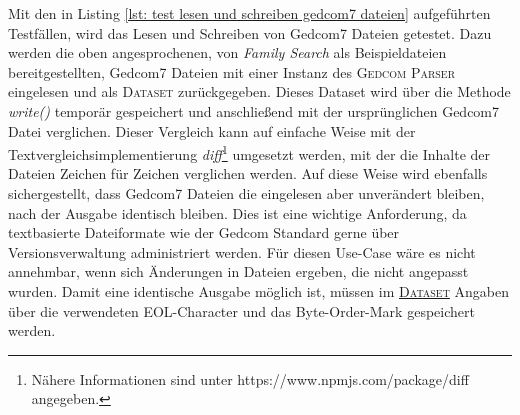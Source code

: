Mit den in Listing \ref{lst: test lesen und schreiben gedcom7 dateien} aufgeführten Testfällen, wird das Lesen und Schreiben von Gedcom7 Dateien getestet. Dazu werden die oben angesprochenen, von \textit{Family Search} als Beispieldateien bereitgestellten, Gedcom7 Dateien mit einer Instanz des \textsc{Gedcom Parser} eingelesen und als \textsc{Dataset} zurückgegeben. Dieses Dataset wird über die Methode \textit{write()} temporär gespeichert und anschließend mit der ursprünglichen Gedcom7 Datei verglichen. Dieser Vergleich kann auf einfache Weise mit der Textvergleichsimplementierung \textit{diff}\footnote{Nähere Informationen sind unter https://www.npmjs.com/package/diff angegeben.} umgesetzt werden, mit der die Inhalte der Dateien Zeichen für Zeichen verglichen werden. 
Auf diese Weise wird ebenfalls sichergestellt, dass Gedcom7 Dateien die eingelesen aber unverändert bleiben, nach der Ausgabe identisch bleiben. Dies ist eine wichtige Anforderung, da textbasierte Dateiformate wie der Gedcom Standard gerne über Versionsverwaltung administriert werden. Für diesen Use-Case wäre es nicht annehmbar, wenn sich Änderungen in Dateien ergeben, die nicht angepasst wurden. Damit eine identische Ausgabe möglich ist, müssen im \hyperref[fig: UML Klassendiagramm Dataset]{\textsc{Dataset}} Angaben über die verwendeten EOL-Character und das Byte-Order-Mark gespeichert werden.


